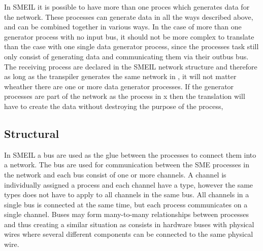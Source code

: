 In SMEIL it is possible to have more than one proces which generates data for the network. These processes can generate data in all the ways described above, and can be combined together in various ways. In the case of more than one generator process with no input bus, it should not be more complex to translate than the case with one single data generator process, since the processes task still only consist of generating data and communicating them via their outbus bus. The receiving process are declared in the SMEIL network structure and therefore as long as the transpiler generates the same network in \cspm, it will not matter wheather there are one or more data generator processes.
If the generator processes are part of the network as the process in x%
then the translation will have to create the data without destroying the purpose of the process, %




\subsection{Structural}

In SMEIL a bus are used as the glue between the processes to connect them into a network. The bus are used for communication between the SME processes in the network and each bus consist of one or more channels. A channel is individually assigned a process and each channel have a type, however the same types does not have to apply to all channels in the same bus. All channels in a single bus is connected at the same time, but each process communicates on a single channel.
Buses may form many-to-many relationships between processes and thus creating a similar situation as consists in hardware buses with physical wires where several different components can be connected to the same physical wire.

